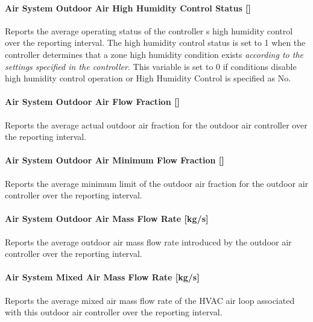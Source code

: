 \paragraph{Air System Outdoor Air High Humidity Control Status {[]}}\label{air-system-outdoor-air-high-humidity-control-status}

Reports the average operating status of the controller s high humidity control over the reporting interval. The high humidity control status is set to 1 when the controller determines that a zone high humidity condition exists \emph{according to the settings specified in the controller}. This variable is set to 0 if conditions disable high humidity control operation or High Humidity Control is specified as No.

\paragraph{Air System Outdoor Air Flow Fraction {[]}}\label{air-system-outdoor-air-flow-fraction}

Reports the average actual outdoor air fraction for the outdoor air controller over the reporting interval.

\paragraph{Air System Outdoor Air Minimum Flow Fraction {[]}}\label{air-system-outdoor-air-minimum-flow-fraction}

Reports the average minimum limit of the outdoor air fraction for the outdoor air controller over the reporting interval.

\paragraph{Air System Outdoor Air Mass Flow Rate {[}kg/s{]}}\label{air-system-outdoor-air-mass-flow-rate-kgs}

Reports the average outdoor air mass flow rate introduced by the outdoor air controller over the reporting interval.

\paragraph{Air System Mixed Air Mass Flow Rate {[}kg/s{]}}\label{air-system-mixed-air-mass-flow-rate-kgs}

Reports the average mixed air mass flow rate of the HVAC air loop associated with this outdoor air controller over the reporting interval.

